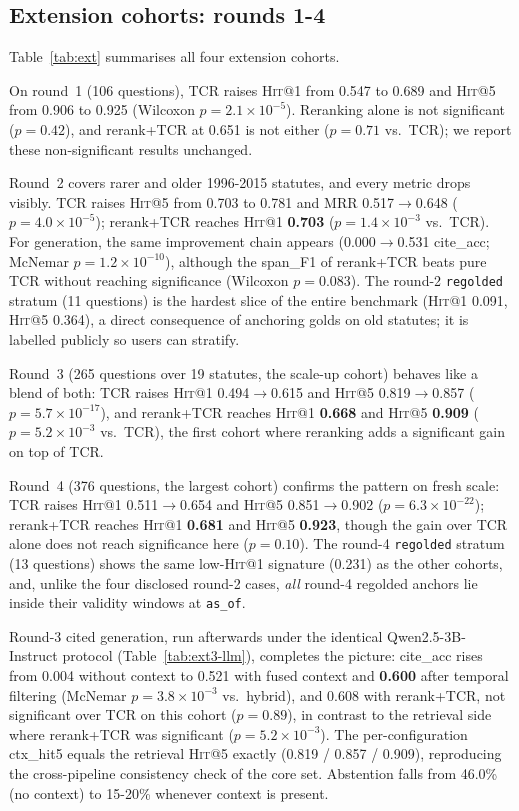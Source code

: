 \documentclass[10pt,a4paper,twocolumn]{article}
\newcommand{\hit}{\textsc{Hit}}
\newcommand{\code}[1]{\texttt{#1}}
\begin{document}
\subsection{Extension cohorts: rounds 1-4}

Table~\ref{tab:ext} summarises all four extension cohorts.

On round~1 (106 questions), TCR raises \hit{}@1 from 0.547 to 0.689 and \hit{}@5 from 0.906 to 0.925 (Wilcoxon $p=2.1\times10^{-5}$). Reranking alone is not significant ($p=0.42$), and rerank+TCR at 0.651 is not either ($p=0.71$ vs.\ TCR); we report these non-significant results unchanged.

Round~2 covers rarer and older 1996-2015 statutes, and every metric drops visibly. TCR raises \hit{}@5 from 0.703 to 0.781 and MRR 0.517$\rightarrow$0.648 ($p=4.0\times10^{-5}$); rerank+TCR reaches \hit{}@1 \textbf{0.703} ($p=1.4\times10^{-3}$ vs.\ TCR). For generation, the same improvement chain appears (0.000$\rightarrow$0.531 cite\_acc; McNemar $p=1.2\times10^{-10}$), although the span\_F1 of rerank+TCR beats pure TCR without reaching significance (Wilcoxon $p=0.083$). The round-2 \code{regolded} stratum (11 questions) is the hardest slice of the entire benchmark (\hit{}@1 0.091, \hit{}@5 0.364), a direct consequence of anchoring golds on old statutes; it is labelled publicly so users can stratify.

Round~3 (265 questions over 19 statutes, the scale-up cohort) behaves like a blend of both: TCR raises \hit{}@1 0.494$\rightarrow$0.615 and \hit{}@5 0.819$\rightarrow$0.857 ($p=5.7\times10^{-17}$), and rerank+TCR reaches \hit{}@1 \textbf{0.668} and \hit{}@5 \textbf{0.909} ($p=5.2\times10^{-3}$ vs.\ TCR), the first cohort where reranking adds a significant gain on top of TCR.

Round~4 (376 questions, the largest cohort) confirms the pattern on fresh scale: TCR raises \hit{}@1 0.511$\rightarrow$0.654 and \hit{}@5 0.851$\rightarrow$0.902 ($p=6.3\times10^{-22}$); rerank+TCR reaches \hit{}@1 \textbf{0.681} and \hit{}@5 \textbf{0.923}, though the gain over TCR alone does not reach significance here ($p=0.10$). The round-4 \code{regolded} stratum (13 questions) shows the same low-\hit{}@1 signature (0.231) as the other cohorts, and, unlike the four disclosed round-2 cases, \emph{all} round-4 regolded anchors lie inside their validity windows at \code{as\_of}.

Round-3 cited generation, run afterwards under the identical Qwen2.5-3B-Instruct protocol (Table~\ref{tab:ext3-llm}), completes the picture: cite\_acc rises from 0.004 without context to 0.521 with fused context and \textbf{0.600} after temporal filtering (McNemar $p=3.8\times10^{-3}$ vs.\ hybrid), and 0.608 with rerank+TCR, not significant over TCR on this cohort ($p=0.89$), in contrast to the retrieval side where rerank+TCR was significant ($p=5.2\times10^{-3}$). The per-configuration ctx\_hit5 equals the retrieval \hit{}@5 exactly (0.819 / 0.857 / 0.909), reproducing the cross-pipeline consistency check of the core set. Abstention falls from 46.0\% (no context) to 15-20\% whenever context is present.
\end{document}
